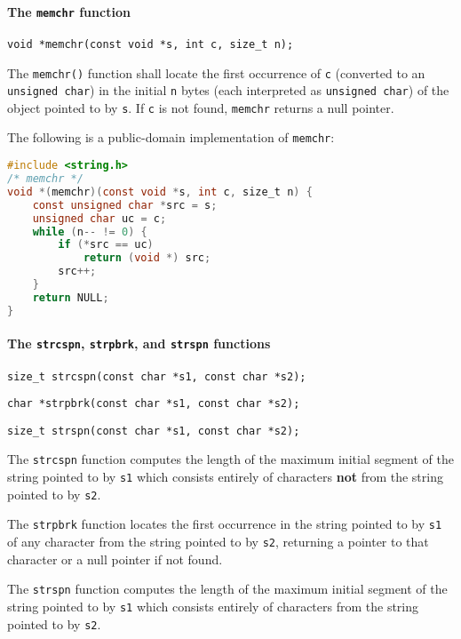 \paragraph{The \texttt{memchr} function}
\texttt{void *memchr(const void *s, int c, size\_t n);}

The \texttt{memchr()} function shall locate the first occurrence of \texttt{c}
(converted to an \texttt{unsigned char}) in the initial \texttt{n} bytes (each
interpreted as \texttt{unsigned char}) of the object pointed to by \texttt{s}.
If \texttt{c} is not found, \texttt{memchr} returns a null pointer.

The following is a public-domain implementation of \texttt{memchr}:
\lstset{basicstyle=\scriptsize, numbers=left, captionpos=b, tabsize=4}
\begin{lstlisting}[caption=Section \thesection listing \arabic{stringcnt},language={C},
breaklines=true,xleftmargin=15pt,label=lst:section\thesection listing\arabic{stringcnt}]
#include <string.h>
/* memchr */
void *(memchr)(const void *s, int c, size_t n) {
	const unsigned char *src = s;
	unsigned char uc = c;
	while (n-- != 0) {
		if (*src == uc)
			return (void *) src;
		src++;
	}
	return NULL;
}
\end{lstlisting}

\paragraph{The \texttt{strcspn}, \texttt{strpbrk}, and \texttt{strspn} functions}
\texttt{size\_t strcspn(const char *s1, const char *s2);}

\texttt{char *strpbrk(const char *s1, const char *s2);}

\texttt{size\_t strspn(const char *s1, const char *s2);}

The \texttt{strcspn} function computes the length of the maximum initial
segment of the string pointed to by \texttt{s1} which consists entirely of
characters \textbf{not} from the string pointed to by \texttt{s2}.

The \texttt{strpbrk} function locates the first occurrence in the string
pointed to by \texttt{s1} of any character from the string pointed to by
\texttt{s2}, returning a pointer to that character or a null pointer if not
found.

The \texttt{strspn} function computes the length of the maximum initial segment
of the string pointed to by \texttt{s1} which consists entirely of characters
from the string pointed to by \texttt{s2}.

